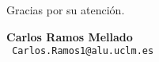 \documentclass[12pt]{beamer} %
\date{Febrero, 2015}
\makeatletter
\def\email{
  Carlos.Ramos1@alu.uclm.es
}
\makeatother
\begin{document}










\begin{blankslide}
  \vspace{1cm}
  \begin{center}
    {\Large Gracias por su atención.}
  \end{center}
  \vspace{1cm}
  \begin{flushright}
    {\bf Carlos Ramos Mellado}\\
    {\tt \email}\\[0.5cm]
  \end{flushright}
\end{blankslide}
\end{document}
